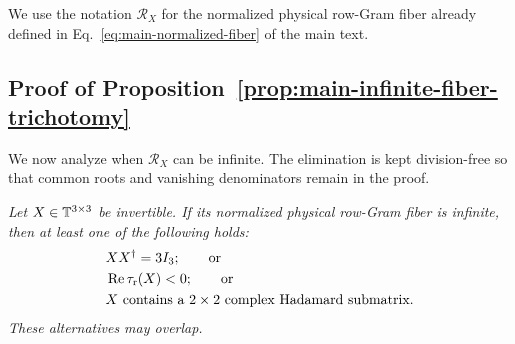 {We use the notation $\mathcal R_X$ for the normalized physical row-Gram fiber already defined in Eq.~\eqref{eq:main-normalized-fiber} of the main text.}

\subsection{{Proof of Proposition~\ref{prop:main-infinite-fiber-trichotomy}}}
\label{sec:local}

{We now analyze when $\mathcal R_X$ can be infinite. The elimination is kept division-free so that common roots and vanishing denominators remain in the proof.}

{\emph{Let $X\in\mathbb T^{3\times3}$ be invertible. If its normalized physical row-Gram fiber is infinite, then at least one of the following holds:}}
\begin{equation}
\begin{aligned}
&XX^{\dagger}=3I_3;\qquad\text{or}\\
&\operatorname{Re}\tau_{\rm r}(X)<0;\qquad\text{or}\\
&X\text{ contains a }2\times2\text{ complex Hadamard submatrix}.
\end{aligned}
\label{eq:trichotomy}
\end{equation}
{\emph{These alternatives may overlap.}}

